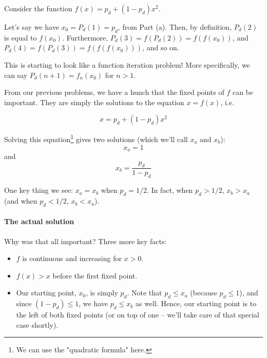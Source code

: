 Consider the function $f(x) = p_d + (1 - p_d)x^2$. 

Let's say we have $x_0 = P_d(1) = p_d$, from Part (a). Then, by definition, $P_d(2)$ is equal to $f(x_0)$. Furthermore, $P_d(3) = f(P_d(2)) = f(f(x_0))$, and $P_d(4) = f(P_d(3)) = f(f(f(x_0)))$, and so on.

This is starting to look like a function iteration problem! More specifically, we can say $P_d(n+1) = f_n(x_0)$ for $n > 1$. 

From our previous problems, we have a hunch that the fixed points of $f$ can be important. They are simply the solutions to the equation $x = f(x)$, i.e.

\begin{equation*}
x = p_d + (1 - p_d)x^2
\end{equation*}

Solving this equation\footnote{We can use the "quadratic formula" here.} gives two solutions (which we'll call $x_a$ and $x_b$):
\begin{equation*}
x_a = 1
\end{equation*}
and 
\begin{equation*}
x_b = \frac{p_d}{1 - p_d}
\end{equation*}

One key thing we see: $x_a = x_b$ when $p_d = 1/2$. In fact, when $p_d > 1/2$, $x_b > x_a$ (and when $p_d < 1/2$, $x_b < x_a$). 




\paragraph{The actual solution}

Why was that all important? Three more key facts:

\begin{itemize}
\item $f$ is continuous and increasing for $x > 0$. 
\item $f(x) > x$ before the first fixed point. 
\item Our starting point, $x_0$, is simply $p_d$. Note that $p_d \leq x_a$ (because $p_d \leq 1$), and since $(1 - p_d) \leq 1$, we have $p_d \leq x_b$ as well. Hence, our starting point is to the left of both fixed points (or on top of one -- we'll take care of that special case shortly). 
\end{itemize}


